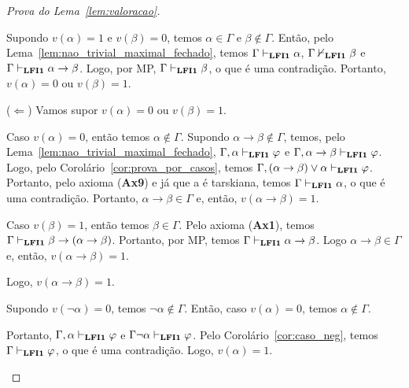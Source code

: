 \begin{proof}[Prova do Lema~\ref{lem:valoracao}]
\begin{provaporcasos}
\begin{adjustwidth}{1cm}{}
                            \noindent Supondo $v(\alpha) = 1$ e $v(\beta) = 0$, temos $\alpha \in \Gamma$ e $\beta \not \in \Gamma$. Então, pelo Lema~\ref{lem:nao_trivial_maximal_fechado}, temos $\Gamma \vdash_{{\normalfont\textbf{LFI1}}{}} \alpha$, $\Gamma \nvdash_{{\normalfont\textbf{LFI1}}{}} \beta$ e $\Gamma \vdash_{{\normalfont\textbf{LFI1}}{}} \alpha \to \beta$. Logo, por MP, $\Gamma \vdash_{{\normalfont\textbf{LFI1}}{}} \beta$, o que é uma contradição. Portanto, $v(\alpha) = 0$ ou $v(\beta) = 1$.

                            \noindent ($\Longleftarrow$) Vamos supor $v(\alpha) = 0$ ou $v(\beta) = 1$.

                            \noindent Caso $v(\alpha) = 0$, então temos $\alpha \not \in \Gamma$. Supondo $\alpha \to \beta \not \in \Gamma$, temos, pelo Lema~\ref{lem:nao_trivial_maximal_fechado}, $\Gamma, \alpha \vdash_{{\normalfont\textbf{LFI1}}{}} \varphi$ e $\Gamma, \alpha \to \beta \vdash_{{\normalfont\textbf{LFI1}}{}} \varphi$. Logo, pelo Corolário~\ref{cor:prova_por_casos}, temos $\Gamma, (\alpha \to \beta) \lor \alpha \vdash_{{\normalfont\textbf{LFI1}}{}} \varphi$. Portanto, pelo axioma (\textbf{Ax9}) e já que a \lfium{} é tarskiana, temos $\Gamma \vdash_{{\normalfont\textbf{LFI1}}{}} \alpha$, o que é uma contradição. Portanto, $\alpha \to \beta \in \Gamma$ e, então, $v(\alpha \to \beta) = 1$.

                            \noindent Caso $v(\beta) = 1$, então temos $\beta \in \Gamma$. Pelo axioma (\textbf{Ax1}), temos $\Gamma \vdash_{{\normalfont\textbf{LFI1}}{}} \beta \to (\alpha \to \beta)$. Portanto, por MP, temos $\Gamma \vdash_{{\normalfont\textbf{LFI1}}{}} \alpha \to \beta$. Logo $\alpha \to \beta \in \Gamma$ e, então, $v(\alpha \to \beta) = 1$.

                            \noindent Logo, $v(\alpha \to \beta) = 1$.

                        \end{adjustwidth}

                        
                        \begin{adjustwidth}{1cm}{}
                            \noindent Supondo $v(\neg \alpha) = 0$, temos $\neg \alpha \not \in \Gamma$. Então, caso $v(\alpha) = 0$, temos $\alpha \not \in \Gamma$. 
                            
                            \noindent Portanto, $\Gamma, \alpha \vdash_{{\normalfont\textbf{LFI1}}{}} \varphi$ e $\Gamma \neg \alpha \vdash_{{\normalfont\textbf{LFI1}}{}} \varphi$. Pelo Corolário~\ref{cor:caso_neg}, temos $\Gamma \vdash_{{\normalfont\textbf{LFI1}}{}} \varphi$, o que é uma contradição. Logo, $v(\alpha) = 1$.

                        \end{adjustwidth}


\end{provaporcasos}
\end{proof}
